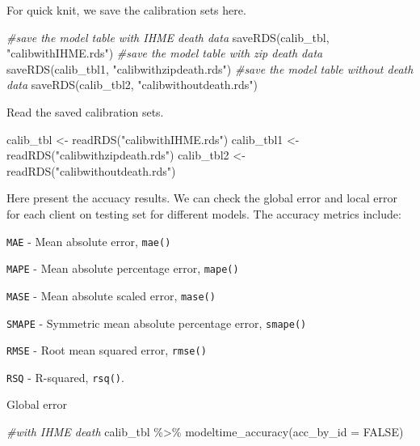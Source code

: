 \documentclass[
]{article}
\newenvironment{Shaded}{\begin{snugshade}}{\end{snugshade}}
\newcommand{\AttributeTok}[1]{\textcolor[rgb]{0.77,0.63,0.00}{#1}}
\newcommand{\CommentTok}[1]{\textcolor[rgb]{0.56,0.35,0.01}{\textit{#1}}}
\newcommand{\ConstantTok}[1]{\textcolor[rgb]{0.00,0.00,0.00}{#1}}
\newcommand{\FunctionTok}[1]{\textcolor[rgb]{0.00,0.00,0.00}{#1}}
\newcommand{\NormalTok}[1]{#1}
\newcommand{\OtherTok}[1]{\textcolor[rgb]{0.56,0.35,0.01}{#1}}
\newcommand{\SpecialCharTok}[1]{\textcolor[rgb]{0.00,0.00,0.00}{#1}}
\newcommand{\StringTok}[1]{\textcolor[rgb]{0.31,0.60,0.02}{#1}}
\begin{document}
For quick knit, we save the calibration sets here.

\begin{Shaded}
\begin{Highlighting}[]
\CommentTok{\#save the model table with IHME death data}
\FunctionTok{saveRDS}\NormalTok{(calib\_tbl, }\StringTok{"calibwithIHME.rds"}\NormalTok{)}
\CommentTok{\#save the model table with zip death data}
\FunctionTok{saveRDS}\NormalTok{(calib\_tbl1, }\StringTok{"calibwithzipdeath.rds"}\NormalTok{)}
\CommentTok{\#save the model table without death data}
\FunctionTok{saveRDS}\NormalTok{(calib\_tbl2, }\StringTok{"calibwithoutdeath.rds"}\NormalTok{)}
\end{Highlighting}
\end{Shaded}

Read the saved calibration sets.

\begin{Shaded}
\begin{Highlighting}[]
\NormalTok{calib\_tbl }\OtherTok{\textless{}{-}} \FunctionTok{readRDS}\NormalTok{(}\StringTok{"calibwithIHME.rds"}\NormalTok{)}
\NormalTok{calib\_tbl1 }\OtherTok{\textless{}{-}} \FunctionTok{readRDS}\NormalTok{(}\StringTok{"calibwithzipdeath.rds"}\NormalTok{)}
\NormalTok{calib\_tbl2 }\OtherTok{\textless{}{-}} \FunctionTok{readRDS}\NormalTok{(}\StringTok{"calibwithoutdeath.rds"}\NormalTok{)}
\end{Highlighting}
\end{Shaded}

Here present the accuacy results. We can check the global error and
local error for each client on testing set for different models. The
accuracy metrics include:

\texttt{MAE} - Mean absolute error, \texttt{mae()}

\texttt{MAPE} - Mean absolute percentage error, \texttt{mape()}

\texttt{MASE} - Mean absolute scaled error, \texttt{mase()}

\texttt{SMAPE} - Symmetric mean absolute percentage error,
\texttt{smape()}

\texttt{RMSE} - Root mean squared error, \texttt{rmse()}

\texttt{RSQ} - R-squared, \texttt{rsq()}.

Global error

\begin{Shaded}
\begin{Highlighting}[]
\CommentTok{\#with IHME death}
\NormalTok{calib\_tbl }\SpecialCharTok{\%\textgreater{}\%} 
    \FunctionTok{modeltime\_accuracy}\NormalTok{(}\AttributeTok{acc\_by\_id =} \ConstantTok{FALSE}\NormalTok{)}
\end{Highlighting}
\end{Shaded}
\end{document}
